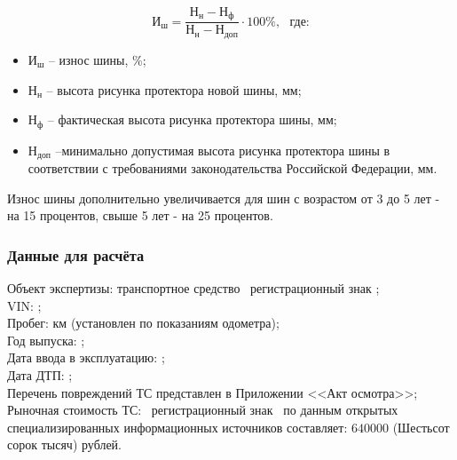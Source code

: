 \begin{equation}\label{eq:sh}
\text{И}_{\text{ш}} = \frac{\text{Н}_{\text{н}}-\text{Н}_{\text{ф}}}{\text{Н}_{\text{н}}-\text{Н}_{\text{доп}}} \cdot{100}\%,  \,\,\,\,\text{где:} 
\end{equation}
%
\begin{itemize}
	\item[ ] $ \text{И}_{\text{ш}} $ -- износ шины, \%;
	\item[ ] $ \text{Н}_{\text{н}} $ -- высота рисунка протектора новой шины, мм;
	\item[ ] $\text{Н}_{\text{ф}} $ -- фактическая высота рисунка протектора шины, мм;
	\item[ ] $ \text{Н}_{\text{доп}} $ --минимально допустимая высота рисунка протектора шины в соответствии с требованиями законодательства Российской Федерации, мм.
\end{itemize}
%
\vspace{5mm}
\relax
%
Износ шины дополнительно увеличивается для шин с возрастом от 3 до 5 лет - на 15 процентов, свыше 5 лет - на 25 процентов.

                                                 

\subsubsection{Данные для расчёта}

\noindent Объект экспертизы:  транспортное средство \tc\,
регистрационный знак ;\\ 
VIN: ;\\
Пробег:     км (установлен по показаниям одометра);\\
Год выпуска:     ;\\ 
Дата ввода в эксплуатацию:  ;\\
Дата ДТП:  ;\\
Перечень повреждений ТС представлен в Приложении <<Акт осмотра>>;\\
Рыночная стоимость ТС: \tc\,
регистрационный знак \grz \, по данным открытых специализированных информационных источников составляет: $640 000$ (Шестьсот сорок тысяч) рублей.\\



